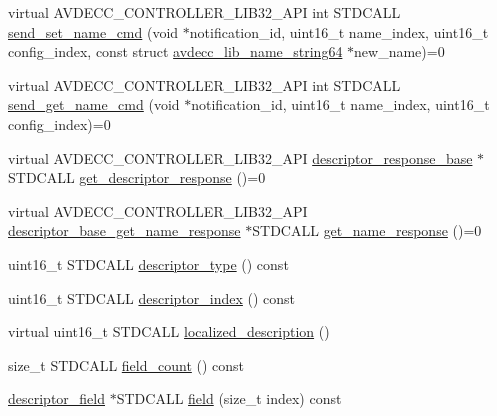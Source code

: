 \begin{DoxyCompactItemize}
\item 
virtual A\+V\+D\+E\+C\+C\+\_\+\+C\+O\+N\+T\+R\+O\+L\+L\+E\+R\+\_\+\+L\+I\+B32\+\_\+\+A\+PI int S\+T\+D\+C\+A\+LL \hyperlink{classavdecc__lib_1_1descriptor__base_a6a8c227d7a202f251c689107df7ede0b}{send\+\_\+set\+\_\+name\+\_\+cmd} (void $\ast$notification\+\_\+id, uint16\+\_\+t name\+\_\+index, uint16\+\_\+t config\+\_\+index, const struct \hyperlink{structavdecc__lib_1_1avdecc__lib__name__string64}{avdecc\+\_\+lib\+\_\+name\+\_\+string64} $\ast$new\+\_\+name)=0
\item 
virtual A\+V\+D\+E\+C\+C\+\_\+\+C\+O\+N\+T\+R\+O\+L\+L\+E\+R\+\_\+\+L\+I\+B32\+\_\+\+A\+PI int S\+T\+D\+C\+A\+LL \hyperlink{classavdecc__lib_1_1descriptor__base_a27ba9959456de53a8de18eead74806f7}{send\+\_\+get\+\_\+name\+\_\+cmd} (void $\ast$notification\+\_\+id, uint16\+\_\+t name\+\_\+index, uint16\+\_\+t config\+\_\+index)=0
\item 
virtual A\+V\+D\+E\+C\+C\+\_\+\+C\+O\+N\+T\+R\+O\+L\+L\+E\+R\+\_\+\+L\+I\+B32\+\_\+\+A\+PI \hyperlink{classavdecc__lib_1_1descriptor__response__base}{descriptor\+\_\+response\+\_\+base} $\ast$S\+T\+D\+C\+A\+LL \hyperlink{classavdecc__lib_1_1descriptor__base_ac64e6a5ee8781eeb9c781953e845b1be}{get\+\_\+descriptor\+\_\+response} ()=0
\item 
virtual A\+V\+D\+E\+C\+C\+\_\+\+C\+O\+N\+T\+R\+O\+L\+L\+E\+R\+\_\+\+L\+I\+B32\+\_\+\+A\+PI \hyperlink{classavdecc__lib_1_1descriptor__base__get__name__response}{descriptor\+\_\+base\+\_\+get\+\_\+name\+\_\+response} $\ast$S\+T\+D\+C\+A\+LL \hyperlink{classavdecc__lib_1_1descriptor__base_aba4bf8a81f90f5bf00d5c8b5a7330145}{get\+\_\+name\+\_\+response} ()=0
\item 
uint16\+\_\+t S\+T\+D\+C\+A\+LL \hyperlink{classavdecc__lib_1_1descriptor__base__imp_aefc543029ab093823c3f5b9d84f0ccc4}{descriptor\+\_\+type} () const 
\item 
uint16\+\_\+t S\+T\+D\+C\+A\+LL \hyperlink{classavdecc__lib_1_1descriptor__base__imp_ac23c0a35276c07cfce8c8660700c2135}{descriptor\+\_\+index} () const 
\item 
virtual uint16\+\_\+t S\+T\+D\+C\+A\+LL \hyperlink{classavdecc__lib_1_1descriptor__base__imp_aa94307532fbb37e2f986fee8fec79373}{localized\+\_\+description} ()
\item 
size\+\_\+t S\+T\+D\+C\+A\+LL \hyperlink{classavdecc__lib_1_1descriptor__base__imp_a9b98d4f427a6c527e9080c938cfa9334}{field\+\_\+count} () const 
\item 
\hyperlink{classavdecc__lib_1_1descriptor__field}{descriptor\+\_\+field} $\ast$S\+T\+D\+C\+A\+LL \hyperlink{classavdecc__lib_1_1descriptor__base__imp_a5f8127d32e2aa54777ca03bf09e8d7b5}{field} (size\+\_\+t index) const 

\end{DoxyCompactItemize}
